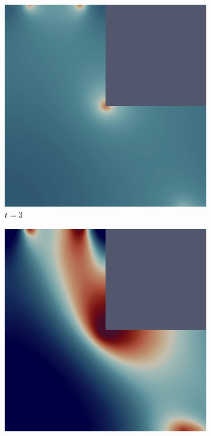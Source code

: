 \vfill\pagebreak

\begin{figure}[H]
    \centering
    \caption{$L$-shape with a Sink and Source: Filtered Distribution}
    \begin{subfigure}{.4\textwidth}
        \includegraphics[width=\textwidth]{imgs/LShapeSource/first.png}
        \caption{$t = 3$}
    \end{subfigure}
    \begin{subfigure}{.4\textwidth}
        \includegraphics[width=\textwidth]{imgs/LShapeSource/second.png}

\end{subfigure}
\end{figure}
